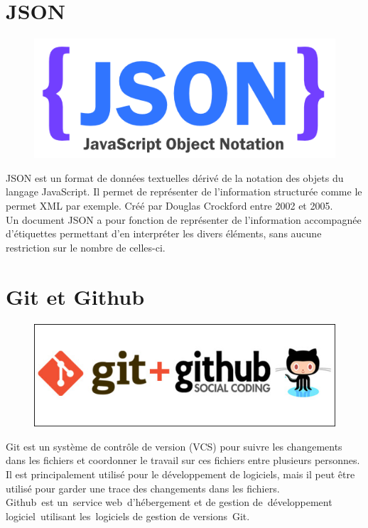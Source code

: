 \documentclass[12pt,a4paper]{report}
\begin{document}
		\newpage	

		\section{JSON}
		\begin{figure}
		\includegraphics[scale=0.3]{./graphics/json.png}
		\end{figure}
JSON est un format de données textuelles dérivé de la notation des objets du
langage JavaScript. Il permet de représenter de l’information structurée comme le permet XML par
exemple. Créé par Douglas Crockford entre 2002 et 2005.\\
Un document JSON a pour fonction de représenter de l'information accompagnée d'étiquettes
permettant d'en interpréter les divers éléments, sans aucune restriction sur le nombre de celles-ci.
		
		\section{Git et Github}
		\begin{figure}
		\includegraphics[scale=0.25]{./graphics/gitgithub.jpg}
		\end{figure}
		Git est un système de contrôle de version (VCS) pour suivre les changements dans les fichiers et coordonner le travail sur ces fichiers entre plusieurs personnes. Il est principalement utilisé pour le développement de logiciels, mais il peut être utilisé pour garder une trace des changements dans les fichiers.\\
Github est un service web d'hébergement et de gestion de développement logiciel utilisant les logiciels de gestion de versions Git.
\end{document}

